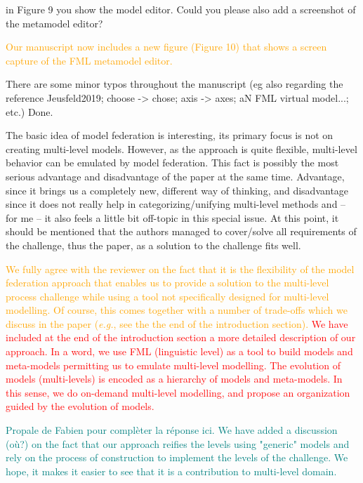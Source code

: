 \documentclass[10pt]{article}
\begin{document}
\begin{response}{in Figure 9 you show the model editor. Could you please also add a screenshot of the metamodel editor?}

\textcolor{orange}{Our manuscript now includes a new figure (Figure 10) that shows a screen capture of the FML metamodel editor.}
\end{response}

\begin{response}{There are some minor typos throughout the manuscript (eg also regarding the reference Jeusfeld2019; choose -> chose; axis -> axes; aN FML virtual model...; etc.)}
Done.
\end{response}


\pagebreak


\begin{response}{The basic idea of model federation is interesting, its primary focus is not on creating multi-level models. However, as the approach is quite flexible, multi-level behavior can be emulated by model federation. This fact is possibly the most serious advantage and disadvantage of the paper at the same time. Advantage, since it brings us a completely new, different way of thinking, and disadvantage since it does not really help in categorizing/unifying multi-level methods and -- for me -- it also feels a little bit off-topic in this special issue. At this point, it should be mentioned that the authors managed to cover/solve all requirements of the challenge, thus the paper, as a solution to the challenge fits well.}

\textcolor{orange}{We fully agree with the reviewer on the fact that it is the flexibility of the model federation approach that enables us to provide a solution to the multi-level process challenge while using a tool not specifically designed for multi-level modelling. Of course, this comes together with a number of trade-offs which we discuss in the paper (\emph{e.g.}, see the the end of the introduction section).}
\textcolor{red}{We have included at the end of the introduction section a more detailed description of our approach. In a word, we use FML (linguistic level) as a tool to build models and meta-models permitting us to emulate multi-level modelling. The evolution of models (multi-levels) is encoded as a hierarchy of models and meta-models. In this sense, we do on-demand multi-level modelling, and propose an organization guided by the evolution of models.}

\textcolor{teal}{Propale de Fabien pour complèter la réponse ici. We have added a discussion (où?) on the fact that our approach reifies the levels using "generic" models and rely on the process of construction to implement the levels of the challenge. We hope, it makes it easier to see that it is a contribution to multi-level domain.}

\end{response}
\end{document}
